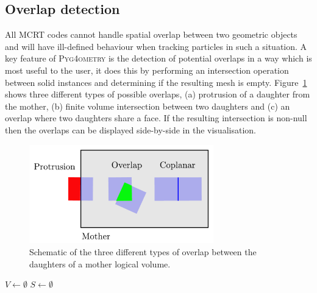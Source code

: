 \documentclass[final,5p,times,twocolumn]{elsarticle}
\newcommand{\PYGEOMETRY}{\textsc{Pyg4ometry}}
\begin{document}
\subsection{Overlap detection}
All MCRT codes cannot handle spatial overlap between two geometric objects and will have ill-defined behaviour when tracking particles
in such a situation.  A key feature of \PYGEOMETRY{} is the detection of potential overlaps in a way which is most useful to the user, it does this by
performing an intersection operation between solid instances and determining if the resulting mesh is empty. Figure~\ref{fig:overlap} shows three different types of possible
overlaps, (a) protrusion of a daughter from the mother, (b)  finite volume intersection between two daughters  and (c) an overlap where two daughters
share a face. If the resulting intersection is non-null then the overlaps can be displayed side-by-side in the visualisation.
\begin{figure}[htbp]
\begin{center}
\includegraphics[width=8cm]{./diagrams/overlap.pdf}
\caption{Schematic of the three different types of overlap between the daughters of a mother logical volume.}
\label{fig:overlap}
\end{center}
\end{figure}


\begin{algorithm}[h]

  $V \longleftarrow \emptyset$
  $S \longleftarrow \emptyset$\;

  \label{algo:overlap}
  \caption{The overlap checking algorithm employed in \PYGEOMETRY{}.  The
    algorithm proceeds by performing the CSG intersection of pairs of
    daughter volume meshes for a given logical volume.  Non-null intersections
    between daughter volume meshes are treated as overlaps.}
\end{algorithm}
\end{document}
